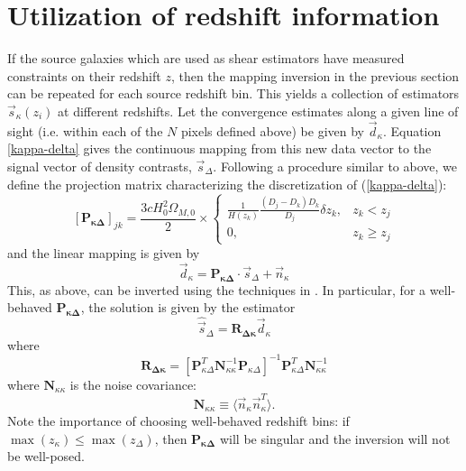 \documentclass[12pt,preprint]{aastex}			%
\begin{document}
\section{Utilization of redshift information}
\label{3D-formalism}
If the source galaxies which are used as shear estimators have measured constraints on their redshift $z$, then the mapping inversion in the previous section can be repeated for each source redshift bin.  This yields a collection of estimators $\vec{s}_\kappa (z_i)$ at different redshifts.  Let the convergence estimates along a given line of sight (i.e. within each of the $N$ pixels defined above) be given by $\vec{d}_\kappa$.  Equation \ref{kappa-delta} gives the continuous mapping from this new data vector to the signal vector of density contrasts, $\vec{s}_\Delta$.  Following a procedure similar to above, we define the projection matrix characterizing the discretization of (\ref{kappa-delta}):
\begin{equation}
  \label{P-kappa-delta}
  [\mathbf{P_{\kappa\Delta}}]_{jk} =  \frac{3cH_0^2\Omega_{M,0}}{2}
  \times\left\{
  \begin{array}{ll}
   \frac{1}{H(z_k)} \frac{(D_j-D_k)D_k}{D_j}\delta z_k, & z_k < z_j\\
    0, & z_k \ge z_j
  \end{array}
  \right.
\end{equation}
and the linear mapping is given by
\begin{equation}
  \label{mapping-kappa-delta}
  \vec{d}_\kappa = \mathbf{P_{\kappa\Delta}}\cdot\vec{s}_\Delta + \vec{n}_\kappa
\end{equation}
This, as above, can be inverted using the techniques in \citet{Hu02}.  In particular, for a well-behaved $\mathbf{P_{\kappa\Delta}}$, the solution is given by the estimator
\begin{equation}
  \hat{\vec{s}}_\Delta = \mathbf{R_{\Delta\kappa}} \vec{d}_\kappa
\end{equation}
where 
\begin{equation}
  \mathbf{R_{\Delta\kappa}} = 
	 [\mathbf{P}^T_{\kappa\Delta} \mathbf{N}^{-1}_{\kappa\kappa}
	   \mathbf{P}_{\kappa\Delta}]^{-1}
	 \mathbf{P}^T_{\kappa\Delta}\mathbf{N}^{-1}_{\kappa\kappa}
\end{equation}
where $\mathbf{N}_{\kappa\kappa}$ is the noise covariance:
\begin{equation}
  \mathbf{N}_{\kappa\kappa} \equiv \langle \vec{n}_\kappa \vec{n}^T_\kappa \rangle .
\end{equation}
Note the importance of choosing well-behaved redshift bins: if $\max(z_\kappa) 
\le \max(z_\Delta)$, then $\mathbf{P_{\kappa\Delta}}$ will be singular and 
the inversion will not be well-posed.  
\end{document}
